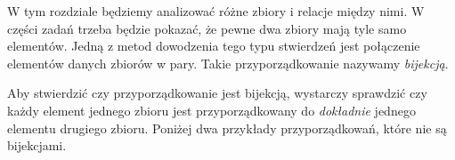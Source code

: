 

\noindent
W tym rozdziale będziemy analizować różne zbiory i relacje między nimi. W części zadań trzeba będzie pokazać, że pewne dwa zbiory mają tyle samo elementów. Jedną z metod dowodzenia tego typu stwierdzeń jest połączenie elementów danych zbiorów w pary. Takie przyporządkowanie nazywamy \textit{bijekcją}.

\begin{center}
\end{center}

\vspace{10px}

\noindent
Aby stwierdzić czy przyporządkowanie jest bijekcją, wystarczy sprawdzić czy każdy element jednego zbioru jest przyporządkowany do \textit{dokładnie} jednego elementu drugiego zbioru. Poniżej dwa przykłady przyporządkowań, które nie są bijekcjami.

